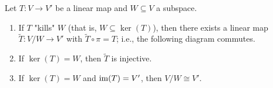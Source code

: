     \begin{theorem}
        Let $T:V \rightarrow V'$ be a linear map and $W \subseteq V$ a subspace.
        \begin{enumerate}[label = (\arabic*),itemsep=1pt,topsep=3pt]
            \item If $T$ "kills" $W$ (that is, $W \subseteq \ker(T)$), then there exists a linear map $\widetilde{T}:V/W \rightarrow V'$ with $\widetilde{T} \circ \pi = T$; i.e., the following diagram commutes.
                \begin{center}
                \end{center}

            \item If $\ker(T) = W$, then $\widetilde{T}$ is injective.
            \item If $\ker(T) = W$ and $\operatorname{im}(T) = V'$, then $V/W \cong V'$.
        \end{enumerate}
    \end{theorem}

